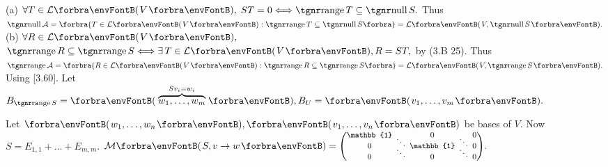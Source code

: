 (a) %
{$\forall T\in\Lm{V},$ $ST=0\Longleftrightarrow \range T\subseteq\null S.$}\parSol{\Ha}
{Thus $\null\mathcal{A}=\Bra{T\in\Lm{V}:\range T\subseteq\null S}=\Lm{V,\null S}.$}\parSol{\vspace{2pt}}
(b) %
{$\forall R\in\Lm{V},$ $\range R\subseteq\range S \Longleftrightarrow\exists\,T\in\Lm{V},R=ST,$ by (3.B 25).}\parSol{\Hb}
{Thus $\range\mathcal{A}=\Bra{R\in\Lm{V}:\range R\subseteq\range S}=\Lm{V,\range S}.$}\envFontDefault\PfEnd\vspace{14pt}\quad
\Or Using {\NOTEFOR} [3.60]. \;Let $B_{\range S}=\Par{\overbrace{w_1,\dots,w_m}^{Sv_i=w_i}},B_{U}=\Par{v_1,\dots,v_m}.$\par\vspace{-10pt}\quad
Let $\Par{w_1,\dots,w_n},\Par{v_1,\dots,v_n}$ be bases of $V.$ Now $S=E_{1,1}+\dots+E_{m,m}.$ $\Mt{S,v\rightarrow w}={\footnotesize\begin{pmatrix} \mathbb{1} &\hspace{-6pt}  &\hspace{-6pt} 0 &\hspace{-6pt}  &\hspace{-6pt} 0\\[-8pt]
		&\hspace{-6pt} \ddots &\hspace{-6pt}  &\hspace{-6pt} \ddots &\hspace{-6pt} \\[-8pt]
		0 &\hspace{-6pt}  &\hspace{-6pt} \mathbb{1} &\hspace{-6pt}  &\hspace{-6pt} 0\\[-8pt]
		&\hspace{-6pt} \ddots &\hspace{-6pt}  &\hspace{-6pt} \ddots &\hspace{-6pt} \\[-8pt]
		0 &\hspace{-6pt}  &\hspace{-6pt} 0 &\hspace{-6pt}  &\hspace{-6pt} 0\end{pmatrix}}.$\par\vspace{-6pt}\quad
